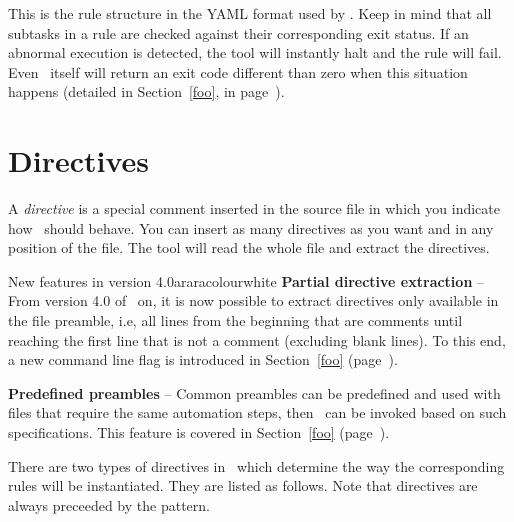 This is the rule structure in the YAML format used by \arara. Keep in mind that all subtasks in a rule are checked against their corresponding exit status. If an abnormal execution is detected, the tool will instantly halt and the rule will fail. Even \arara\ itself will return an exit code different than zero when this situation happens (detailed in Section~\ref{foo}, in page~\pageref{foo}).

\section{Directives}
\label{sec:directives}

A \emph{directive} is a special comment inserted in the source file in which you indicate how \arara\ should behave. You can insert as many directives as you want and in any position of the file. The tool will read the whole file and extract the directives.

\begin{messagebox}{New features in version 4.0}{araracolour}{\icinfo}{white}
\setlength{\parskip}{1em}
\textbf{Partial directive extraction} -- From version 4.0 of \arara\ on, it is now possible to extract directives only available in the file preamble, i.e, all lines from the beginning that are comments until reaching the first line that is not a comment (excluding blank lines). To this end, a new command line flag is introduced in Section~\ref{foo} (page~\pageref{foo}).

\textbf{Predefined preambles} -- Common preambles can be predefined and used with files that require the same automation steps, then \arara\ can be invoked based on such specifications. This feature is covered in Section~\ref{foo} (page~\pageref{foo}).
\end{messagebox}


There are two types of directives in \arara\ which determine the way the corresponding rules will be instantiated. They are listed as follows. Note that directives are always preceeded by the  pattern.

